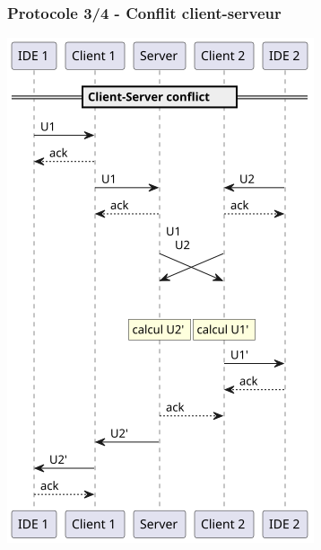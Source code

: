 \documentclass{beamer}
\begin{document}
\begin{frame}
    \frametitle{Protocole 3/4 - Conflit client-serveur}
    \includegraphics[width=\textwidth,height=0.8\textheight,keepaspectratio]{diagrams/3.png}
\end{frame}
\end{document}
